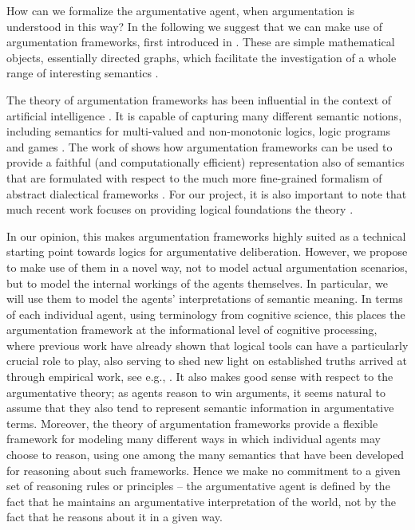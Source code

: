 \documentclass[greybox]{svmult}
\begin{document}
How can we formalize the argumentative agent, when argumentation is understood in this way? In the following we suggest that we can make use of argumentation frameworks, first introduced in \cite{dung}. These are simple mathematical objects, essentially directed graphs, which facilitate the investigation of a whole range of interesting semantics \cite{baroni}.

The theory of argumentation frameworks has been influential in the context of artificial intelligence \cite{rahwan}. It is capable of capturing many different semantic notions, including semantics for multi-valued and non-monotonic logics, logic programs and games \cite{dung,dyrkolbotn}. The work of \cite{brewka} shows how argumentation frameworks can be used to provide a faithful (and computationally efficient) representation also of semantics that are formulated with respect to the much more fine-grained formalism of abstract dialectical frameworks \cite{brewka1}. For our project, it is also important to note that much recent work focuses on providing logical foundations the theory \cite{grossi,grossi1,arieli,caminada}.

In our opinion, this makes argumentation frameworks highly suited as a technical starting point towards logics for argumentative deliberation. However, we propose to make use of them in a novel way, not to model actual argumentation scenarios, but to model the internal workings of the agents themselves. In particular, we will use them to model the agents' interpretations of semantic meaning. In terms of each individual agent, using terminology from cognitive science, this places the argumentation framework at the informational level of cognitive processing, where previous work have already shown that logical tools can have a particularly crucial role to play, also serving to shed new light on established truths arrived at through empirical work, see e.g., \cite{stenning}. It also makes good sense with respect to the argumentative theory; as agents reason to win arguments, it seems natural to assume that they also tend to represent semantic information in argumentative terms. Moreover, the theory of argumentation frameworks provide a flexible framework for modeling many different ways in which individual agents may choose to reason, using one among the many semantics that have been developed for reasoning about such frameworks. Hence we make no commitment to a given set of reasoning rules or principles -- the argumentative agent is defined by the fact that he maintains an argumentative interpretation of the world, not by the fact that he reasons about it in a given way.
\end{document}
